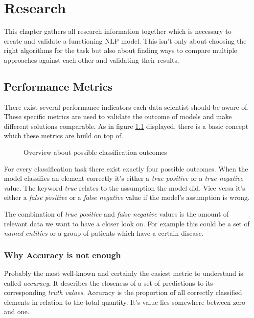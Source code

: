 \chapter{Research}

This chapter gathers all research information together which is necessary to create and validate a functioning NLP model. This
isn't only about choosing the right algorithms for the task but also about finding ways to compare multiple approaches against
each other and validating their results.

\section{Performance Metrics}
\label{chap:formulas}
There exist several performance indicators each data scientist should be aware of. These specific metrics are used to validate
the outcome of models and make different solutions comparable. As in figure \ref{fig:metrics} displayed, there is a basic
concept which these metrics are build on top of.

\begin{figure}[!ht]
\centering
{}
\caption{Overview about possible classification outcomes\cite{wiki01}}
\label{fig:metrics}
\end{figure}

For every classification task there exist exactly four possible outcomes. When the model classifies an element correctly it's
either a \emph{true positive} or a \emph{true negative} value. The keyword \emph{true} relates to the assumption the model did.
Vice versa it's either a \emph{false positive} or a \emph{false negative} value if the model's assumption is wrong.

The combination of \emph{true positive} and \emph{false negative} values is the amount of relevant data we want to have a closer
look on. For example this could be a set of \emph{named entities} or a group of patients which have a certain disease.

\subsection{Why Accuracy is not enough}

Probably the most well-known and certainly the easiest metric to understand is called \emph{accuracy}. It describes the
closeness of a set of predictions to its corresponding \emph{truth values}. Accuracy is the proportion of all correctly classified
elements in relation to the total quantity. It's value lies somewhere between zero and one.


